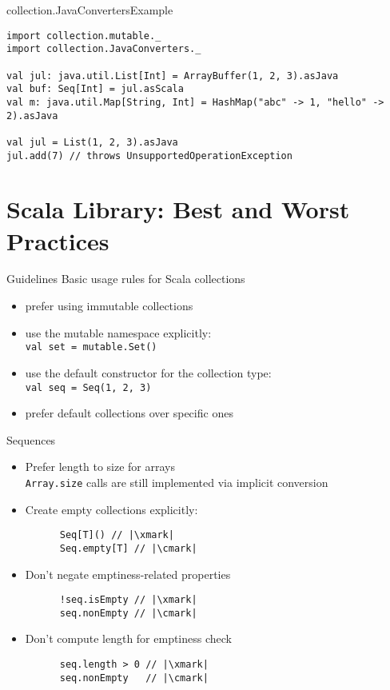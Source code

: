 \documentclass[aspectratio=169]{beamer}
\begin{document}
\begin{frame}[fragile]{collection.JavaConverters}{Example}
\begin{verbatim}
import collection.mutable._
import collection.JavaConverters._

val jul: java.util.List[Int] = ArrayBuffer(1, 2, 3).asJava
val buf: Seq[Int] = jul.asScala
val m: java.util.Map[String, Int] = HashMap("abc" -> 1, "hello" -> 2).asJava

val jul = List(1, 2, 3).asJava
jul.add(7) // throws UnsupportedOperationException
\end{verbatim}
\end{frame}

\section{Scala Library: Best and Worst Practices}

\begin{frame}[fragile]{Guidelines}
  Basic usage rules for Scala collections \cite{twitter1}
  \pause
  \begin{itemize}
    \item prefer using immutable collections
      \pause
    \item use the mutable namespace explicitly: \\
      \texttt{val set = mutable.Set()}
      \pause
    \item use the default constructor for the collection type: \\
      \texttt{val seq = Seq(1, 2, 3)}
      \pause
    \item prefer default collections over specific ones
  \end{itemize}
\end{frame}

\begin{frame}[fragile]{Sequences}
  \begin{itemize}
    \item Prefer length to size for arrays\\
      \texttt{Array.size} calls are still implemented via implicit conversion
      \pause
    \item Create empty collections explicitly: \\
      \begin{verbatim}
      Seq[T]() // |\xmark|
      Seq.empty[T] // |\cmark|
      \end{verbatim}
      \pause
    \item Don’t negate emptiness-related properties \\
      \begin{verbatim}
      !seq.isEmpty // |\xmark|
      seq.nonEmpty // |\cmark|
      \end{verbatim}
      \pause
    \item Don’t compute length for emptiness check \\
      \begin{verbatim}
      seq.length > 0 // |\xmark|
      seq.nonEmpty   // |\cmark|
      \end{verbatim}
  \end{itemize}
\end{frame}
\end{document}
